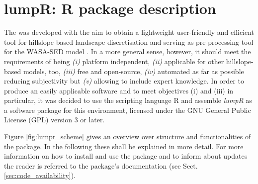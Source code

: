 \section{lumpR: R package description}
\label{sec:lump}
The \DIFdelbegin {}\DIFdelend \emph{\DIFdelbegin {}\DIFdelend \DIFaddbegin \textbf{}\textbf{}\textbf{}\textbf{}\textbf{}\DIFaddend } \DIFaddbegin {}\DIFaddend was developed with the aim to obtain a lightweight user-friendly and efficient tool for hillslope-based landscape discretisation and serving as pre-processing tool for the WASA-SED model \DIFdelbegin {}\DIFdelend \DIFaddbegin {}\DIFaddend . 
In a more general sense, however, it should meet the requirements of being
\emph{(i)} platform independent,
\emph{(ii)} applicable for other hillslope-based models, too,
\emph{(iii)} free and open-source,
\emph{(iv)} automated as far as possible reducing subjectivity but
\emph{(v)} allowing to include expert knowledge.
In order to produce an easily applicable software and to meet objectives (i) and (iii) in particular, it was decided to use the scripting language R \citep{Rcoretream2015} and assemble \emph{lumpR} as a software package for this environment, licensed under the GNU General Public License (GPL) version 3 or later.

Figure \ref{fig:lumpr_scheme} gives an overview over structure and functionalities of the package.
In the following these shall be explained in more detail.
For more information on how to install and use the package and to inform about updates the reader is referred to the package's documentation (see Sect.\DIFaddbegin \DIFadd{\ }\DIFaddend \ref{sec:code_availability}).

